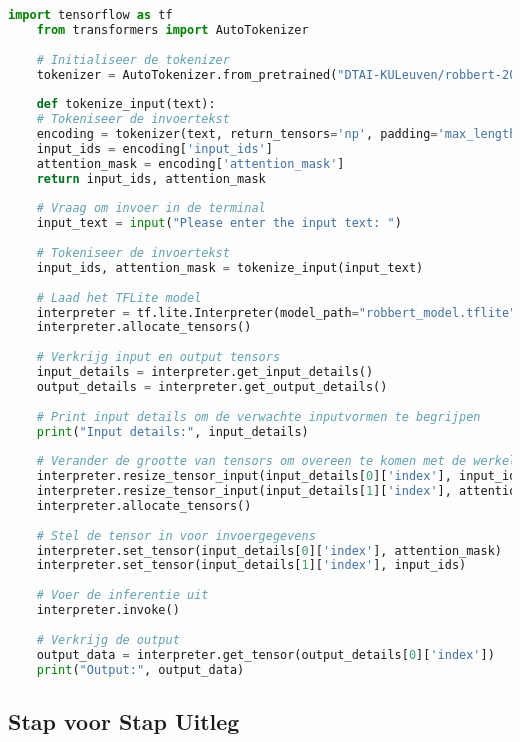 \begin{lstlisting}[language=Python, caption={Code voor het controleren van modeloutput verwerking}]
    import tensorflow as tf
    from transformers import AutoTokenizer
    
    # Initialiseer de tokenizer
    tokenizer = AutoTokenizer.from_pretrained("DTAI-KULeuven/robbert-2023-dutch-large")
    
    def tokenize_input(text):
    # Tokeniseer de invoertekst
    encoding = tokenizer(text, return_tensors='np', padding='max_length', truncation=True, max_length=128)
    input_ids = encoding['input_ids']
    attention_mask = encoding['attention_mask']
    return input_ids, attention_mask
    
    # Vraag om invoer in de terminal
    input_text = input("Please enter the input text: ")
    
    # Tokeniseer de invoertekst
    input_ids, attention_mask = tokenize_input(input_text)
    
    # Laad het TFLite model
    interpreter = tf.lite.Interpreter(model_path="robbert_model.tflite")
    interpreter.allocate_tensors()
    
    # Verkrijg input en output tensors
    input_details = interpreter.get_input_details()
    output_details = interpreter.get_output_details()
    
    # Print input details om de verwachte inputvormen te begrijpen
    print("Input details:", input_details)
    
    # Verander de grootte van tensors om overeen te komen met de werkelijke inputvormen
    interpreter.resize_tensor_input(input_details[0]['index'], input_ids.shape)
    interpreter.resize_tensor_input(input_details[1]['index'], attention_mask.shape)
    interpreter.allocate_tensors()
    
    # Stel de tensor in voor invoergegevens
    interpreter.set_tensor(input_details[0]['index'], attention_mask)
    interpreter.set_tensor(input_details[1]['index'], input_ids)
    
    # Voer de inferentie uit
    interpreter.invoke()
    
    # Verkrijg de output
    output_data = interpreter.get_tensor(output_details[0]['index'])
    print("Output:", output_data)
\end{lstlisting}

\subsection{Stap voor Stap Uitleg}

